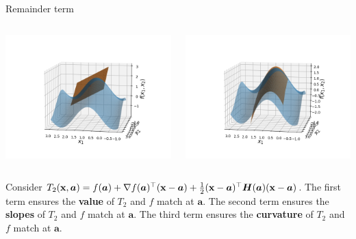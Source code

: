 \begin{vbframe}{Remainder term}
\begin{columns}
\begin{column}{0.48\textwidth}
  \includegraphics[width = \textwidth]{figure_man/Taylor2D/Taylor2D_1st100.png}
\end{column}
\begin{column}{0.48\textwidth}
  \includegraphics[width = \textwidth]{figure_man/Taylor2D/Taylor2D_2nd-100.png}
\end{column}
\end{columns}

\begin{footnotesize}
Consider $T_2(\mathbf{x}, \bm{a}) = f(\bm{a}) + \nabla f(\bm{a})^\top (\mathbf{x} - \bm{a}) + \frac{1}{2}(\mathbf{x} - \bm{a})^\top\bm{H}(\bm{a})(\mathbf{x} - \bm{a})$. The first term ensures the \textbf{value} of $T_2$ and $f$ match at $\bm{a}$. The second term ensures the \textbf{slopes} of $T_2$ and $f$ match at $\bm{a}$. The third term ensures the \textbf{curvature} of $T_2$ and $f$ match at $\bm{a}$. 
\end{footnotesize}


\end{vbframe}


